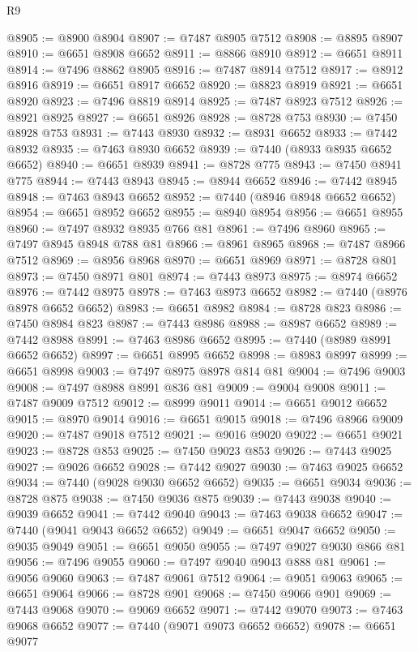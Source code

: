 \begin{lexlean}{R9}
\begin{coremodule}
{{{{{{{{{{{{{{{{{{{{{{{{{{{{{{{{{{{{{{{{{{{{{{{{{{{{{{{{{{{{{{{{{{{{{{{{{{{{{{{{{{{{@8905 := @8900 @8904
@8907 := @7487 @8905 @7512
@8908 := @8895 @8907
@8910 := @6651 @8908 @6652
@8911 := @8866 @8910
@8912 := @6651 @8911
@8914 := @7496 @8862 @8905
@8916 := @7487 @8914 @7512
@8917 := @8912 @8916
@8919 := @6651 @8917 @6652
@8920 := @8823 @8919
@8921 := @6651 @8920
@8923 := @7496 @8819 @8914
@8925 := @7487 @8923 @7512
@8926 := @8921 @8925
@8927 := @6651 @8926
@8928 := @8728 @753
@8930 := @7450 @8928 @753
@8931 := @7443 @8930
@8932 := @8931 @6652
@8933 := @7442 @8932
@8935 := @7463 @8930 @6652
@8939 := @7440 (@8933 @8935 @6652 @6652)
@8940 := @6651 @8939
@8941 := @8728 @775
@8943 := @7450 @8941 @775
@8944 := @7443 @8943
@8945 := @8944 @6652
@8946 := @7442 @8945
@8948 := @7463 @8943 @6652
@8952 := @7440 (@8946 @8948 @6652 @6652)
@8954 := @6651 @8952 @6652
@8955 := @8940 @8954
@8956 := @6651 @8955
@8960 := @7497 @8932 @8935 @766 @81
@8961 := @7496 @8960
@8965 := @7497 @8945 @8948 @788 @81
@8966 := @8961 @8965
@8968 := @7487 @8966 @7512
@8969 := @8956 @8968
@8970 := @6651 @8969
@8971 := @8728 @801
@8973 := @7450 @8971 @801
@8974 := @7443 @8973
@8975 := @8974 @6652
@8976 := @7442 @8975
@8978 := @7463 @8973 @6652
@8982 := @7440 (@8976 @8978 @6652 @6652)
@8983 := @6651 @8982
@8984 := @8728 @823
@8986 := @7450 @8984 @823
@8987 := @7443 @8986
@8988 := @8987 @6652
@8989 := @7442 @8988
@8991 := @7463 @8986 @6652
@8995 := @7440 (@8989 @8991 @6652 @6652)
@8997 := @6651 @8995 @6652
@8998 := @8983 @8997
@8999 := @6651 @8998
@9003 := @7497 @8975 @8978 @814 @81
@9004 := @7496 @9003
@9008 := @7497 @8988 @8991 @836 @81
@9009 := @9004 @9008
@9011 := @7487 @9009 @7512
@9012 := @8999 @9011
@9014 := @6651 @9012 @6652
@9015 := @8970 @9014
@9016 := @6651 @9015
@9018 := @7496 @8966 @9009
@9020 := @7487 @9018 @7512
@9021 := @9016 @9020
@9022 := @6651 @9021
@9023 := @8728 @853
@9025 := @7450 @9023 @853
@9026 := @7443 @9025
@9027 := @9026 @6652
@9028 := @7442 @9027
@9030 := @7463 @9025 @6652
@9034 := @7440 (@9028 @9030 @6652 @6652)
@9035 := @6651 @9034
@9036 := @8728 @875
@9038 := @7450 @9036 @875
@9039 := @7443 @9038
@9040 := @9039 @6652
@9041 := @7442 @9040
@9043 := @7463 @9038 @6652
@9047 := @7440 (@9041 @9043 @6652 @6652)
@9049 := @6651 @9047 @6652
@9050 := @9035 @9049
@9051 := @6651 @9050
@9055 := @7497 @9027 @9030 @866 @81
@9056 := @7496 @9055
@9060 := @7497 @9040 @9043 @888 @81
@9061 := @9056 @9060
@9063 := @7487 @9061 @7512
@9064 := @9051 @9063
@9065 := @6651 @9064
@9066 := @8728 @901
@9068 := @7450 @9066 @901
@9069 := @7443 @9068
@9070 := @9069 @6652
@9071 := @7442 @9070
@9073 := @7463 @9068 @6652
@9077 := @7440 (@9071 @9073 @6652 @6652)
@9078 := @6651 @9077
}}}}}}}}}}}}}}}}}}}}}}}}}}}}}}}}}}}}}}}}}}}}}}}}}}}}}}}}}}}}}}}}}}}}}}}}}}}}}}}}}}}}
\end{coremodule}
\end{lexlean}

